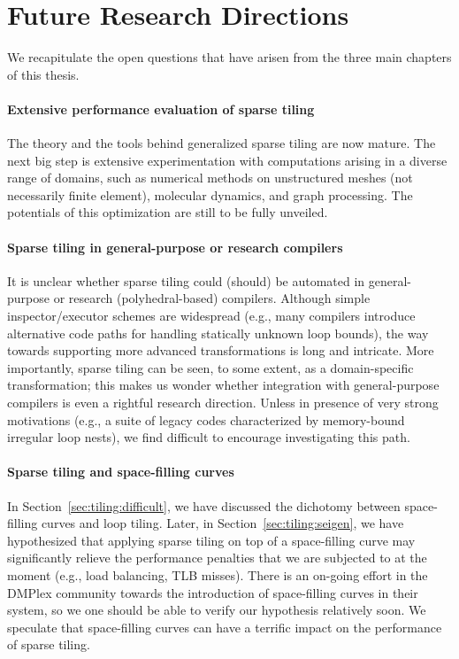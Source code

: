 \section{Future Research Directions}
We recapitulate the open questions that have arisen from the three main chapters of this thesis. 

\paragraph{Extensive performance evaluation of sparse tiling}
The theory and the tools behind generalized sparse tiling are now mature. The next big step is extensive experimentation with computations arising in a diverse range of domains, such as numerical methods on unstructured meshes (not necessarily finite element), molecular dynamics, and graph processing. The potentials of this optimization are still to be fully unveiled. 

\paragraph{Sparse tiling in general-purpose or research compilers}
It is unclear whether sparse tiling could (should) be automated in general-purpose or research (polyhedral-based) compilers. Although simple inspector/executor schemes are widespread (e.g., many compilers introduce alternative code paths for handling statically unknown loop bounds), the way towards supporting more advanced transformations is long and intricate. More importantly, sparse tiling can be seen, to some extent, as a domain-specific transformation; this makes us wonder whether integration with general-purpose compilers is even a rightful research direction. Unless in presence of very strong motivations (e.g., a suite of legacy codes characterized by memory-bound irregular loop nests), we find difficult to encourage investigating this path.

\paragraph{Sparse tiling and space-filling curves}
In Section~\ref{sec:tiling:difficult}, we have discussed the dichotomy between space-filling curves and loop tiling. Later, in Section~\ref{sec:tiling:seigen}, we have hypothesized that applying sparse tiling on top of a space-filling curve may significantly relieve the performance penalties that we are subjected to at the moment (e.g., load balancing, TLB misses). There is an on-going effort in the DMPlex community towards the introduction of space-filling curves in their system, so we one should be able to verify our hypothesis relatively soon. We speculate that space-filling curves can have a terrific impact on the performance of sparse tiling.

